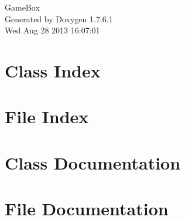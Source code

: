 \documentclass[a4paper]{book}
\begin{document}
\hypersetup{pageanchor=false,citecolor=blue}
\begin{titlepage}
\vspace*{7cm}
\begin{center}
{\Large \-Game\-Box }\\
\vspace*{1cm}
{\large \-Generated by Doxygen 1.7.6.1}\\
\vspace*{0.5cm}
{\small Wed Aug 28 2013 16:07:01}\\
\end{center}
\end{titlepage}
\clearemptydoublepage
{}
\tableofcontents
\clearemptydoublepage
{}
\hypersetup{pageanchor=true,citecolor=blue}
\chapter{\-Class \-Index}

\chapter{\-File \-Index}

\chapter{\-Class \-Documentation}










\chapter{\-File \-Documentation}













\printindex
\end{document}
